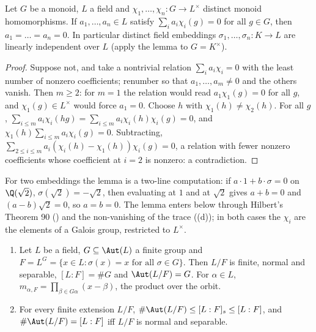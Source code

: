 \begin{theorem}\label{thm:galois:dedekind}
Let $G$ be a monoid, $L$ a field and $\chi_1,\dots,\chi_n\colon G\to L^\times$ distinct monoid homomorphisms. If $a_1,\dots,a_n\in L$ satisfy
$\sum_ia_i\chi_i(g)=0$ for all $g\in G$, then $a_1=\dots=a_n=0$. In particular distinct field embeddings $\sigma_1,\dots,\sigma_n\colon K\to L$ are linearly
independent over $L$ (apply the lemma to $G=K^\times$).
\end{theorem}

\begin{proof}
Suppose not, and take a nontrivial relation $\sum_ia_i\chi_i=0$ with the least number of nonzero coefficients; renumber so that $a_1,\dots,a_m\ne0$ and
the others vanish. Then $m\ge2$: for $m=1$ the relation would read $a_1\chi_1(g)=0$ for all $g$, and $\chi_1(g)\in L^\times$ would force $a_1=0$. Choose $h$ with $\chi_1(h)\ne\chi_2(h)$. For all $g$, $\sum_{i\le m}a_i\chi_i(hg)=\sum_{i\le m}
a_i\chi_i(h)\chi_i(g)=0$, and $\chi_1(h)\sum_{i\le m}a_i\chi_i(g)=0$. Subtracting, $\sum_{2\le i\le m}a_i(\chi_i(h)-\chi_1(h))\chi_i(g)=0$, a relation with fewer
nonzero coefficients whose coefficient at $i=2$ is nonzero: a contradiction.
\end{proof}

For two embeddings the lemma is a two-line computation: if $a\cdot1+b\cdot\sigma=0$ on $\Q(\sqrt2)$, $\sigma(\sqrt2)=-\sqrt2$, then evaluating at $1$ and at $\sqrt2$
gives $a+b=0$ and $(a-b)\sqrt2=0$, so $a=b=0$. The lemma enters below through Hilbert's Theorem 90 () and the non-vanishing of the trace
((d)); in both cases the $\chi_i$ are the elements of a Galois group, restricted to $L^\times$.

\begin{theorem}[Artin]\label{thm:galois:artin}
\begin{enumerate}[label=(\alph*)]
\item Let $L$ be a field, $G\subseteq\Aut(L)$ a finite group and $F=L^G=\{x\in L:\sigma(x)=x\text{ for all }\sigma\in G\}$. Then $L/F$ is finite, normal and
separable, $[L:F]=\#G$ and $\Aut(L/F)=G$. For $\alpha\in L$, $m_{\alpha,F}=\prod_{\beta\in G\alpha}(x-\beta)$, the product over the orbit.
\item For every finite extension $L/F$, $\#\Aut(L/F)\le[L:F]_s\le[L:F]$, and $\#\Aut(L/F)=[L:F]$ iff $L/F$ is normal and separable.
\end{enumerate}
\end{theorem}

